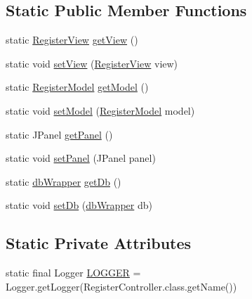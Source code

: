 \subsection*{Static Public Member Functions}
\begin{DoxyCompactItemize}
\item 
static \mbox{\hyperlink{classcom_1_1_b_n_u_1_1pages_1_1register_1_1_register_view}{Register\+View}} \mbox{\hyperlink{classcom_1_1_b_n_u_1_1pages_1_1register_1_1_register_controller_ae8f177504b68c0293b5b03171b9ea8ed}{get\+View}} ()
\item 
static void \mbox{\hyperlink{classcom_1_1_b_n_u_1_1pages_1_1register_1_1_register_controller_a27751a097fa6758264e1f49b5f42cce0}{set\+View}} (\mbox{\hyperlink{classcom_1_1_b_n_u_1_1pages_1_1register_1_1_register_view}{Register\+View}} view)
\item 
static \mbox{\hyperlink{classcom_1_1_b_n_u_1_1pages_1_1register_1_1_register_model}{Register\+Model}} \mbox{\hyperlink{classcom_1_1_b_n_u_1_1pages_1_1register_1_1_register_controller_a31bf4165b65e12888f146cdbdd8aed81}{get\+Model}} ()
\item 
static void \mbox{\hyperlink{classcom_1_1_b_n_u_1_1pages_1_1register_1_1_register_controller_a5d9459553004003303bb765587a22523}{set\+Model}} (\mbox{\hyperlink{classcom_1_1_b_n_u_1_1pages_1_1register_1_1_register_model}{Register\+Model}} model)
\item 
static J\+Panel \mbox{\hyperlink{classcom_1_1_b_n_u_1_1pages_1_1register_1_1_register_controller_aba22898db0e9472c42ead60b5fd8e482}{get\+Panel}} ()
\item 
static void \mbox{\hyperlink{classcom_1_1_b_n_u_1_1pages_1_1register_1_1_register_controller_a48d70600758b6963c35b9501b02e1dd0}{set\+Panel}} (J\+Panel panel)
\item 
static \mbox{\hyperlink{interfacecom_1_1_b_n_u_1_1database_1_1db_wrapper}{db\+Wrapper}} \mbox{\hyperlink{classcom_1_1_b_n_u_1_1pages_1_1register_1_1_register_controller_a5ad4cc9e91cbe86f598efe304aea9730}{get\+Db}} ()
\item 
static void \mbox{\hyperlink{classcom_1_1_b_n_u_1_1pages_1_1register_1_1_register_controller_a8bbbd91e149d0c5efbe7a9d56a94c1ad}{set\+Db}} (\mbox{\hyperlink{interfacecom_1_1_b_n_u_1_1database_1_1db_wrapper}{db\+Wrapper}} db)
\end{DoxyCompactItemize}
\subsection*{Static Private Attributes}
\begin{DoxyCompactItemize}
\item 
static final Logger \mbox{\hyperlink{classcom_1_1_b_n_u_1_1pages_1_1register_1_1_register_controller_aafda8752744457c4548ea9e25411a343}{L\+O\+G\+G\+ER}} = Logger.\+get\+Logger(Register\+Controller.\+class.\+get\+Name())
\end{DoxyCompactItemize}


